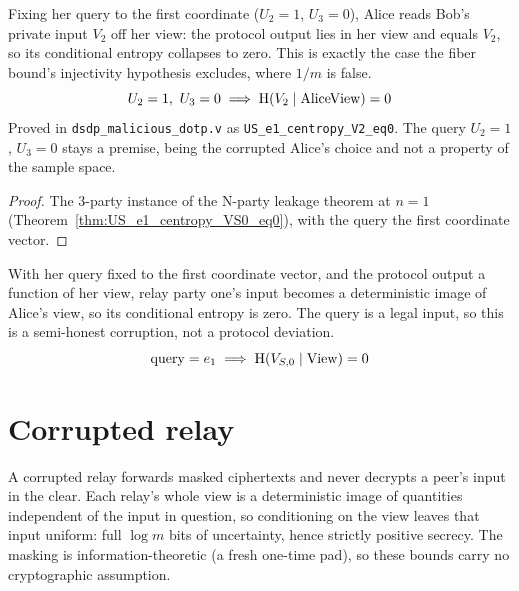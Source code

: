 \begin{theorem}
  \label{thm:US_e1_centropy_V2_eq0}
  \rocqok
  Fixing her query to the first coordinate ($U_2 = 1$, $U_3 = 0$), Alice reads
  Bob's private input $V_2$ off her view: the protocol output lies in her view and
  equals $V_2$, so its conditional entropy collapses to zero. This is exactly the
  case the fiber bound's injectivity hypothesis excludes, where $1/m$ is false.
  \[ U_2 = 1,\ U_3 = 0 \;\Longrightarrow\; \mathrm{H}(V_2 \mid \mathrm{AliceView}) = 0 \]
  Proved in \texttt{dsdp\_malicious\_dotp.v} as
  \texttt{US\_e1\_centropy\_V2\_eq0}. The query $U_2 = 1$, $U_3 = 0$ stays a
  premise, being the corrupted Alice's choice and not a property of the sample
  space.
\end{theorem}
\begin{proof}
  \rocqok
  The 3-party instance of the N-party leakage theorem at $n=1$
  (Theorem~\ref{thm:US_e1_centropy_VS0_eq0}), with the query the first
  coordinate vector.
\end{proof}

\begin{theorem}
  \label{thm:US_e1_centropy_VS0_eq0}
  \rocqok
  With her query fixed to the first coordinate vector, and the protocol output a
  function of her view, relay party one's input becomes a deterministic image of
  Alice's view, so its conditional entropy is zero. The query is a legal input, so
  this is a semi-honest corruption, not a protocol deviation.
  \[ \mathrm{query} = e_1 \;\Longrightarrow\; \mathrm{H}(V_{S,0} \mid \mathrm{View}) = 0 \]
\end{theorem}

\part{Corrupted relay}

A corrupted relay forwards masked ciphertexts and never decrypts a peer's input in
the clear. Each relay's whole view is a deterministic image of quantities
independent of the input in question, so conditioning on the view leaves that
input uniform: full $\log m$ bits of uncertainty, hence strictly positive secrecy.
The masking is information-theoretic (a fresh one-time pad), so these bounds carry
no cryptographic assumption.

